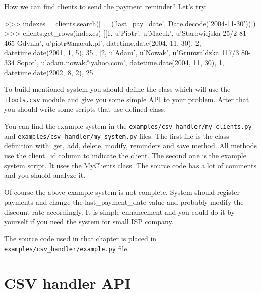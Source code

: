 \documentclass[a4paper]{book}
\begin{document}
How we can find clients to send the payment reminder? Let's try:
\begin{code}
    >>> indexes = clients.search([
    ... ('last_pay_date', Date.decode('2004-11-30'))])
    >>> clients.get_rows(indexes)
    [[1, u'Piotr', u'Macuk', u'Starowiejska 25/2 81-465 Gdynia', 
    u'piotr@macuk.pl', datetime.date(2004, 11, 30), 2, 
    datetime.date(2001, 1, 5), 35], [2, u'Adam', u'Nowak', 
    u'Grunwaldzka 117/3 80-334 Sopot', u'adam.nowak@yahoo.com', 
    datetime.date(2004, 11, 30), 1, datetime.date(2002, 8, 2), 25]]
\end{code}

To build mentioned system you should define the class which will use the
{\tt itools.csv} module and give you some simple API to your problem. After
that you should write some scripts that use defined class.

You can find the example system in the 
{\tt examples/csv\_handler/my\_clients.py} and 
{\tt examples/csv\_handler/my\_system.py} files. The first file is the class
definition with: get, add, delete, modify, reminders and save method. 
All methods use the client\_id column to indicate the client. The second one
is the example system script. It uses the MyClients class. 
The source code has a lot of comments and you shuold analyze it.

Of course the above example system is not complete. System should register
payments and change the last\_payment\_date value and probably modify 
the discount rate accordingly. It is simple enhancement and you could do it 
by yourself if you need the system for small ISP company.

The source code used in that chapter is placed in \\
{\tt examples/csv\_handler/example.py} file.


\section{CSV handler API}
\end{document}
